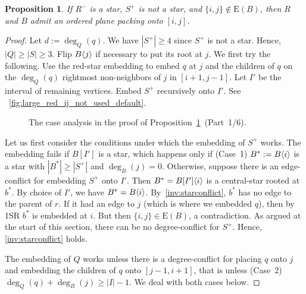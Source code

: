 \documentclass[11pt,a4paper,colorlinks=true,urlcolor=blue,citecolor=red]{article}
\theoremstyle{plain}
\newtheorem{proposition}[theorem]{Proposition}
\newcommand{\EB}{\mathrm{E}(B)}
\begin{document}
\begin{proposition}\label{prop:rec_large_red_star_ij_not_used_sp_not_star}
  If $R^-$ is a star, $S^+$ is not a star, and
  $\{i,j\}\not\in\EB$, then $R$ and $B$ admit an ordered plane
  packing onto $[i,j]$.
\end{proposition}
\begin{proof}
  Let $d:=\deg_Q(q)$. We have $|S^+|\geq 4$ since $S^+$ is not a star.
  Hence, $|Q|\geq|S|\geq 3$. Flip $B\langle{j}\rangle$ if necessary to put its
  root at $j$. We first try the following. Use the red-star
  embedding to embed $q$ at $j$ and the children of $q$ on the
  $\deg_Q(q)$ rightmost non-neighbors of $j$ in $[i+1,j-1]$. Let $I'$ be
  the interval of remaining vertices. Embed $S^+$ recursively onto $I'$.
  See \figurename~\ref{fig:large_red_ij_not_used_default}.

  \begin{figure}[b]
    \centering\hfil {}\hfil {}\hfil {}\hfil {}\hfil \caption{The case analysis in the proof of
      Proposition~\ref{prop:rec_large_red_star_ij_not_used_sp_not_star}~(Part~1/6).}
  \end{figure}

  Let us first consider the conditions under which the embedding of
  $S^+$ works.
The embedding fails if $B[I']$ is a star, which happens only if
  (Case~1) $B^*:=B\langle{i}\rangle$ is a star with $|B^*|\geq|S^+|$ and
  $\deg_B(j)=0$. Otherwise, suppose there is an edge-conflict for
  embedding $S^+$ onto $I'$. Then $B^*=B{[I']}\langle{i}\rangle$ is a
  central-star rooted at $b^*$. By choice of $I'$, we have
  $B^*=B\langle{i}\rangle$. By~\ref{inv:starconflict}, $b^*$ has no edge to the
  parent of $r$. If it had an edge to $j$ (which is where we embedded
  $q$), then by 1SR $b^*$ is embedded at $i$. But then $\{i,j\}\in\EB$,
  a contradiction. As argued at the start of this section, there can be
  no degree-conflict for $S^+$. Hence, \ref{inv:starconflict} holds.

  The embedding of $Q$ works unless there is a degree-conflict for
  placing $q$ onto $j$ and embedding the children of $q$ onto
  $[j-1,i+1]$, that is unless (Case~2)
  $\deg_Q(q)+\deg_B(j)\geq|I|-1$. We deal with both cases below.


\end{proof}
\end{document}
